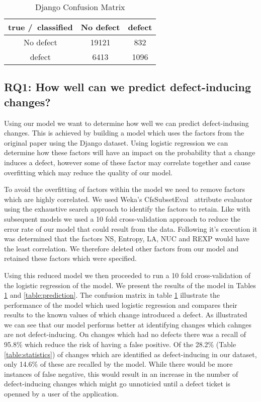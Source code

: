 \documentclass[10pt, conference]{IEEEtran}
\begin{document}
\begin{table}[t]
	\centering
	\caption{Django Confusion Matrix}
	\begin{tabular}{|c|c|c|}
		\hline 
		true /\ classified  & No defect  & defect \tabularnewline
		\hline 
		No defect  & 19121  & 832 \tabularnewline
		\hline 
		defect  & 6413  & 1096 \tabularnewline
		\hline 
	\end{tabular}
	\label{table:confusion}
\end{table}

\subsection{RQ1: How well can we predict defect-inducing changes?}
\label{sec:rq1}

Using our model we want to determine how well we can predict defect-indusing changes. This is achieved by building a model which uses the factors from the original paper using the Django dataset. Using logistic regression we can determine how these factors will have an impact on the probability that a change induces a defect, however some of these factor may correlate together and cause overfitting which may reduce the quality of our model.  

To avoid the overfitting of factors within the model we need to remove factors which are highly correlated. We used Weka's CfsSubsetEval~\cite{Hall1998} attribute evaluator using the exhaustive search approach to identify the factors to retain. Like with subsequent models we used a 10 fold cross-validation approach to reduce the error rate of our model that could result from the data. Following it's execution it was determined that the factors NS, Entropy, LA, NUC and REXP would have the least correlation. We therefore deleted other factors from our model and retained these factors which were specified.

Using this reduced model we then proceeded to run a 10 fold cross-validation of the logistic regression of the model. We present the results of the model in Tables \ref{table:confusion} and \ref{table:prediction}. The confusion matrix in table \ref{table:confusion} illustrate the performance of the model which used logistic regression and compares their results to the known values of which change introduced a defect. As illustrated we can see that our model performs better at identifying changes which cahnges are not defect-inducing. On changes which had no defects there was a recall of 95.8\% which reduce the risk of having a false positive. Of the 28.2\% (Table \ref{table:statistics}) of changes which are identified as defect-inducing in our dataset, only 14.6\% of these are recalled by the model. While there would be more instances of false negative, this would result in an increase in the number of defect-inducing changes which might go unnoticied until a defect ticket is openned by a user of the application. 
\end{document}
